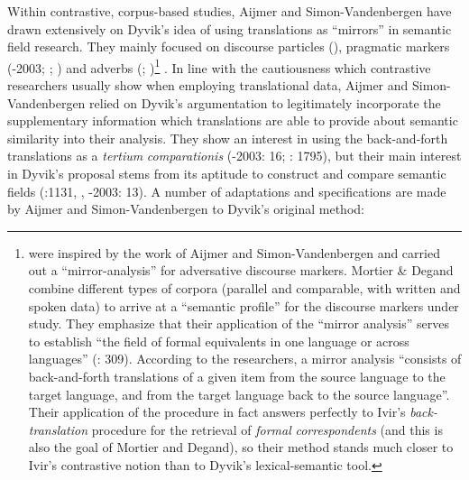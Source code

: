Within contrastive, corpus-based studies, Aijmer and Simon-Vandenbergen have drawn extensively on Dyvik’s idea of using translations as “mirrors” in semantic field research. They mainly focused on discourse particles (\citealt{simon-vandenbergen_english_2013}), pragmatic markers (\citealt{simon-vandenbergen_expectation_2002}-2003; \citealt{aijmer_model_2004}; \citealt{fischer_pragmatic_2006}) and adverbs (\citealt{simon-vandenbergen_semantic_2007}; \citealt{simon-vandenbergen_english_2013})\footnote{\citet{mortier_adversative_2009} were inspired by the work of Aijmer and Simon-Vandenbergen and carried out a “mirror-analysis” for adversative discourse markers. Mortier \& Degand combine different types of corpora (parallel and comparable, with written and spoken data) to arrive at a “semantic profile” for the discourse markers under study. They emphasize that their application of the “mirror analysis” serves to establish “the field of formal equivalents in one language or across languages” (\citealt{mortier_adversative_2009}: 309). According to the researchers, a mirror analysis “consists of back-and-forth translations of a given item from the source language to the target language, and from the target language back to the source language”. Their application of the procedure in fact answers perfectly to Ivir’s \textit{back-translation} procedure for the retrieval of \textit{formal} \textit{correspondents} (and this is also the goal of Mortier and Degand), so their method stands much closer to Ivir’s contrastive notion than to Dyvik’s lexical-semantic tool.} . In line with the cautiousness which contrastive researchers usually show when employing translational data, Aijmer and Simon-Vandenbergen relied on Dyvik’s argumentation to legitimately incorporate the supplementary information which translations are able to provide about semantic similarity into their analysis. They show an interest in using the back-and-forth translations as a \textit{tertium} \textit{comparationis} (\citealt{simon-vandenbergen_expectation_2002}-2003: 16; \citealt{aijmer_model_2004}: 1795), but their main interest in Dyvik’s proposal stems from its aptitude to construct and compare semantic fields (\citealt{aijmer_discourse_2003}:1131, \citealt[1782]{aijmer_model_2004}, \citealt{simon-vandenbergen_expectation_2002}-2003: 13). A number of adaptations and specifications are made by Aijmer and Simon-Vandenbergen to Dyvik’s original method:



